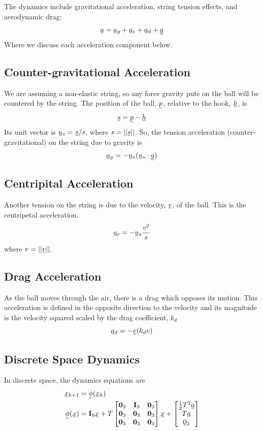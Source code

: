 \documentclass[11pt, letterpaper, twocolumn]{article}
\newcommand{\ul}[1] %
    {{}\mkern1mu\underline{\mkern-1mu#1\mkern-1mu}\mkern1mu}
\begin{document}
The dynamics include gravitational acceleration, string tension effects, and aerodynamic drag:
\[
\ul{a} = \ul{a}_g + \ul{a}_c + \ul{a}_d + \ul{g}
\]
Where we discuss each acceleration component below.

\subsection*{Counter-gravitational Acceleration}
We are assuming a non-elastic string, so any force gravity puts on the ball
will be countered by the string. The position of the ball, $\ul{p}$, relative
to the hook, $\ul{h}$, is
\[
\ul{s} = \ul{p} - \ul{h}
\]
Its unit vector is $\ul{u}_s = \ul{s}/s$, where $s = ||\ul{s}||$. So, the 
tension acceleration (counter-gravitational) on the string due to gravity is
\[
\ul{a}_g = -\ul{u}_s(\ul{u}_s \cdot \ul{g})
\]

\subsection*{Centripital Acceleration}
Another tension on the string is due to the velocity, $\ul{v}$, of the ball.
This is the centripetal acceleration.
\[
\ul{a}_c = -\ul{u}_s\frac{v^2}{s}
\]
where $v = ||\ul{v}||$.

\subsection*{Drag Acceleration}
As the ball moves through the air, there is a drag which opposes its motion.
This acceleration is defined in the opposite direction to the velocity and its
magnitude is the velocity squared scaled by the drag coefficient, $k_d$
\[
\ul{a}_d = -\ul{v}(k_dv)
\]

\subsection*{Discrete Space Dynamics}
In discrete space, the dynamics equations are
\[\begin{aligned}
\ul{x}_{k+1} &= \ul{\phi}(\ul{x}_k) \\
\ul{\phi}(\ul{x}) &= \mathbf{I}_9\ul{x}+T \begin{bmatrix}
    \mathbf{0}_3 & \mathbf{I}_3 & \mathbf{0}_3 \\
    \mathbf{0}_3 & \mathbf{0}_3 & \mathbf{0}_3 \\
    \mathbf{0}_3 & \mathbf{0}_3 & \mathbf{0}_3
    \end{bmatrix}\ul{x}+
    \begin{bmatrix}
        \frac{1}{2}T^2\ul{a} \\
        T\ul{a} \\
        \ul{0}_3
    \end{bmatrix}
\end{aligned}
\]
\end{document}

